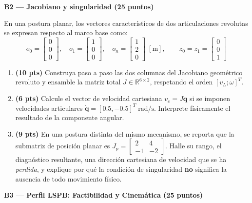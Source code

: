 \documentclass[11pt, a4paper]{article}
\begin{document}
\vspace{0.3cm}
\noindent\textbf{\large B2 — Jacobiano y singularidad (25 puntos)}

En una postura planar, los vectores característicos de dos articulaciones revolutas se expresan respecto al marco base como:
\begin{equation*}
    o_0 = \begin{bmatrix} 0 \\ 0 \\ 0 \end{bmatrix},\quad o_1 = \begin{bmatrix} 1 \\ 0 \\ 0 \end{bmatrix},\quad o_n = \begin{bmatrix} 1 \\ 2 \\ 0 \end{bmatrix} \;[\mathrm{m}],\qquad z_0 = z_1 = \begin{bmatrix} 0 \\ 0 \\ 1 \end{bmatrix}
\end{equation*}

\begin{enumerate}
    \item \textbf{(10 pts)} Construya paso a paso las dos columnas del Jacobiano geométrico revoluto y ensamble la matriz total $J \in \mathbb{R}^{6 \times 2}$, respetando el orden $[v_L ; \omega]^T$.
    \item \textbf{(6 pts)} Calcule el vector de velocidad cartesiana $v_e = J\dot{\mathbf{q}}$ si se imponen velocidades articulares $\dot{\mathbf{q}} = [0.5, -0.5]^T\;\mathrm{rad/s}$. Interprete físicamente el resultado de la componente angular.
    \item \textbf{(9 pts)} En una postura distinta del mismo mecanismo, se reporta que la submatriz de posición planar es $J_p = \begin{bmatrix} 2 & 4 \\ -1 & -2 \end{bmatrix}$. Halle su rango, el diagnóstico resultante, una dirección cartesiana de velocidad que se ha \textit{perdida}, y explique por qué la condición de singularidad \textbf{no} significa la ausencia de todo movimiento físico.
\end{enumerate}

\vspace{0.3cm}
\noindent\textbf{\large B3 — Perfil LSPB: Factibilidad y Cinemática (25 puntos)}
\end{document}
